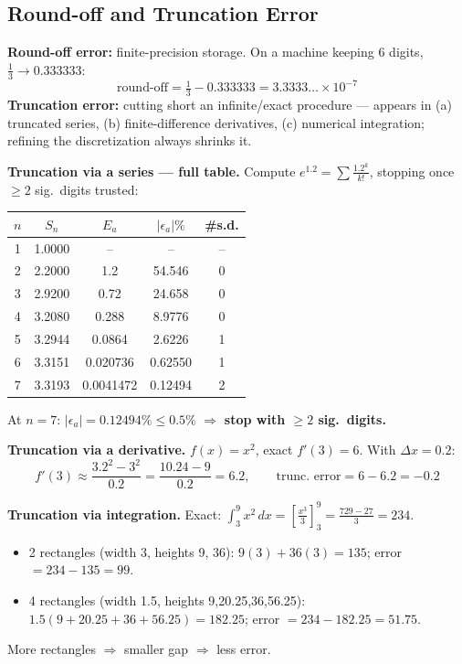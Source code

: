 \subsection{Round-off and Truncation Error}

\textbf{Round-off error:} finite-precision storage. On a machine keeping 6 digits, $\tfrac13\to0.333333$:
\[
\text{round-off} = \tfrac13-0.333333 = 3.3333\ldots\times10^{-7}
\]
\textbf{Truncation error:} cutting short an infinite/exact procedure — appears in (a) truncated series, (b) finite-difference derivatives, (c) numerical integration; refining the discretization always shrinks it.

\begin{examplebox}
\textbf{Truncation via a series — full table.} Compute $e^{1.2}=\sum \tfrac{1.2^k}{k!}$, stopping once $\ge2$ sig.\ digits trusted:
\begin{center}
\begin{tabular}{@{}ccccc@{}}
\toprule
$n$ & $S_n$ & $E_a$ & $|\epsilon_a|\%$ & \#s.d.\\
\midrule
1&1.0000&--&--&--\\
2&2.2000&1.2&54.546&0\\
3&2.9200&0.72&24.658&0\\
4&3.2080&0.288&8.9776&0\\
5&3.2944&0.0864&2.6226&1\\
6&3.3151&0.020736&0.62550&1\\
7&3.3193&0.0041472&0.12494&2\\
\bottomrule
\end{tabular}
\end{center}
At $n=7$: $|\epsilon_a|=0.12494\%\le0.5\%$ $\Rightarrow$ \textbf{stop with $\ge2$ sig.\ digits.}

\textbf{Truncation via a derivative.} $f(x)=x^2$, exact $f'(3)=6$. With $\Delta x=0.2$:
\[
f'(3)\approx\frac{3.2^2-3^2}{0.2}=\frac{10.24-9}{0.2}=6.2, \qquad \text{trunc.\ error} = 6-6.2=-0.2
\]

\textbf{Truncation via integration.} Exact: $\int_3^9 x^2\,dx = \left[\tfrac{x^3}{3}\right]_3^9=\tfrac{729-27}{3}=234$.
\begin{itemize}
\item 2 rectangles (width 3, heights 9, 36): $9(3)+36(3)=135$; error $=234-135=99$.
\item 4 rectangles (width 1.5, heights 9,20.25,36,56.25): $1.5(9+20.25+36+56.25)=182.25$; error $=234-182.25=51.75$.
\end{itemize}
More rectangles $\Rightarrow$ smaller gap $\Rightarrow$ less error.
\end{examplebox}


